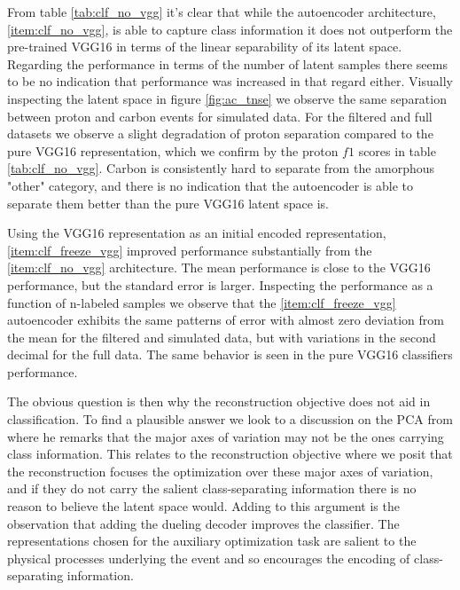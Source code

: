 From table \ref{tab:clf_no_vgg} it's clear that while the autoencoder architecture, \ref{item:clf_no_vgg}, is able to capture class information it does not outperform the pre-trained VGG16 in terms of the linear separability of its latent space. Regarding the performance in terms of the number of latent samples there seems to be no indication that performance was increased in that regard either. Visually inspecting the latent space in figure \ref{fig:ac_tnse} we observe the same separation between proton and carbon events for simulated data. For the filtered and full datasets we observe a slight degradation of proton separation compared to the pure VGG16 representation, which we confirm by the proton $f1$ scores in table \ref{tab:clf_no_vgg}. Carbon is consistently hard to separate from the amorphous "other" category, and there is no indication that the autoencoder is able to separate them better than the pure VGG16 latent space is. 

Using the VGG16 representation as an initial encoded representation, \ref{item:clf_freeze_vgg} improved performance substantially from the \ref{item:clf_no_vgg} architecture. The mean performance is  close to the VGG16 performance, but the standard error is larger.  Inspecting the performance as a function of  n-labeled samples we observe that the \ref{item:clf_freeze_vgg} autoencoder exhibits the same  patterns of error with almost zero deviation from the mean for the filtered and simulated data, but with variations in the second decimal for the full data. The same behavior is seen in the pure VGG16 classifiers performance.

The obvious question is then why the reconstruction objective does not aid in classification. To find a plausible answer we look to a discussion on the PCA from \cite{Jolliffe1982} where he remarks that the major axes of variation may not be the ones carrying class information. This relates to the reconstruction objective where we posit that the reconstruction focuses the optimization over these major axes of variation, and if they do not carry the salient class-separating information there is no reason to believe the latent space would. Adding to this argument is the observation that adding the dueling decoder improves the classifier. The representations chosen for the auxiliary optimization task are salient to the physical processes underlying the event and so encourages the encoding of class-separating information.


